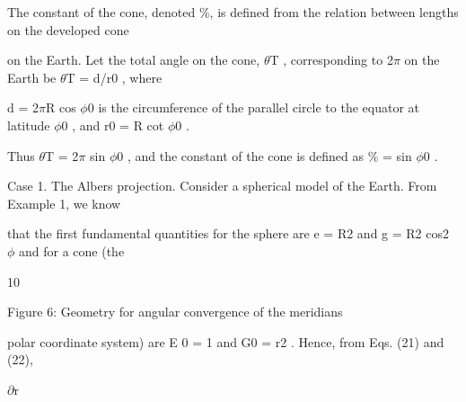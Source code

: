 \documentclass[a4paper,portrait,12pt]{article}
\begin{document}
\begin{flushleft}
The constant of the cone, denoted \%, is defined from the relation between lengths on the developed cone
\end{flushleft}


\begin{flushleft}
on the Earth. Let the total angle on the cone, $\theta$T , corresponding to 2$\pi$ on the Earth be $\theta$T = d/r0 , where
\end{flushleft}


\begin{flushleft}
d = 2$\pi$R cos $\phi$0 is the circumference of the parallel circle to the equator at latitude $\phi$0 , and r0 = R cot $\phi$0 .
\end{flushleft}


\begin{flushleft}
Thus $\theta$T = 2$\pi$ sin $\phi$0 , and the constant of the cone is defined as \% = sin $\phi$0 .
\end{flushleft}


\begin{flushleft}
Case 1. The Albers projection. Consider a spherical model of the Earth. From Example 1, we know
\end{flushleft}


\begin{flushleft}
that the first fundamental quantities for the sphere are e = R2 and g = R2 cos2 $\phi$ and for a cone (the
\end{flushleft}





10





\begin{flushleft}
\newpage
Figure 6: Geometry for angular convergence of the meridians
\end{flushleft}


\begin{flushleft}
polar coordinate system) are E 0 = 1 and G0 = r2 . Hence, from Eqs. (21) and (22),
\end{flushleft}


\newpage



\begin{flushleft}
\newpage
 $\partial$r
\end{flushleft}


\newpage
\end{document}
